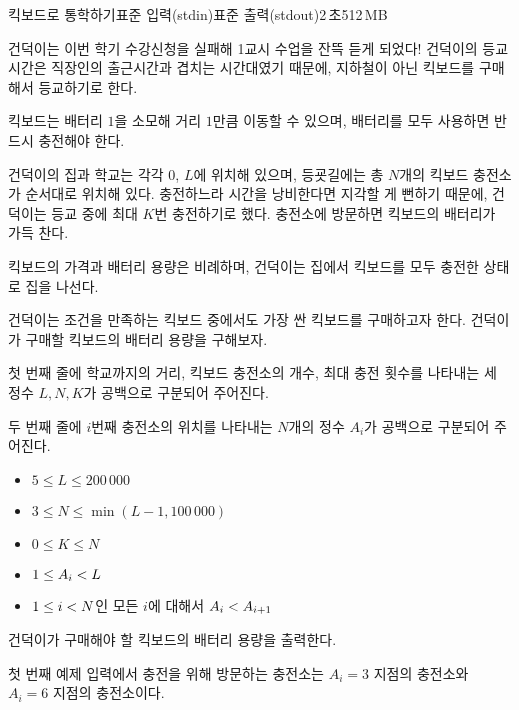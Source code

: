 \begin{problem}{킥보드로 통학하기}{표준 입력(stdin)}{표준 출력(stdout)}{2\,초}{512\,MB}

건덕이는 이번 학기 수강신청을 실패해 1교시 수업을 잔뜩 듣게 되었다! 건덕이의 등교시간은 직장인의 출근시간과 겹치는 시간대였기 때문에, 지하철이 아닌 킥보드를 구매해서 등교하기로 한다.

킥보드는 배터리 $1$을 소모해 거리 $1$만큼 이동할 수 있으며, 배터리를 모두 사용하면 반드시 충전해야 한다.

건덕이의 집과 학교는 각각 $0$, $L$에 위치해 있으며, 등굣길에는 총 $N$개의 킥보드 충전소가 순서대로 위치해 있다. 충전하느라 시간을 낭비한다면 지각할 게 뻔하기 때문에, 건덕이는 등교 중에 최대 $K$번 충전하기로 했다. 충전소에 방문하면 킥보드의 배터리가 가득 찬다.

킥보드의 가격과 배터리 용량은 비례하며, 건덕이는 집에서 킥보드를 모두 충전한 상태로 집을 나선다. 

건덕이는 조건을 만족하는 킥보드 중에서도 가장 싼 킥보드를 구매하고자 한다. 건덕이가 구매할 킥보드의 배터리 용량을 구해보자. 

\InputFile
첫 번째 줄에 학교까지의 거리, 킥보드 충전소의 개수, 최대 충전 횟수를 나타내는 세 정수 $L, N, K$가 공백으로 구분되어 주어진다.

두 번째 줄에 $i$번째 충전소의 위치를 나타내는 $N$개의 정수 $A_i$가 공백으로 구분되어 주어진다.

\newcommand{\lt}{\ensuremath <}
\newcommand{\gt}{\ensuremath >}
\begin{itemize}
 \item $5 \le L \le 200\,000$

 \item $3 \le N \le \min(L - 1, 100\,000)$

 \item $0 \le K \le N$

 \item $1 \le A_i \lt L$

 \item $1 \le i \lt N$인 모든 $i$에 대해서 $A_i \lt A_{i+1}$
\end{itemize}


\OutputFile
건덕이가 구매해야 할 킥보드의 배터리 용량을 출력한다.

\Examples

\begin{example}
%
%
\end{example}
\Note
첫 번째 예제 입력에서 충전을 위해 방문하는 충전소는 $A_i = 3$ 지점의 충전소와 $A_i = 6$ 지점의 충전소이다.

\end{problem}
